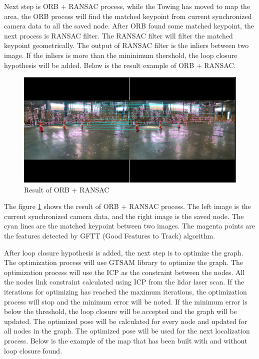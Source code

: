 \documentclass[conference]{IEEEtran}
\begin{document}
\par    
Next step is ORB + RANSAC process, while the Towing has moved to map the area, the ORB process will find the matched keypoint from current synchronized camera data to all the saved node. After ORB found some matched keypoint, the next process is RANSAC filter. The RANSAC filter will filter the matched keypoint geometrically. The output of RANSAC filter is the inliers between two image. If the inliers is more than the mininimum thershold, the loop closure hypothesis will be added. Below is the result example of ORB + RANSAC. 
\begin{figure}[H]
	\centering
	\includegraphics[width=\linewidth]{../konten/orb_ransac.png}
	\caption{Result of ORB + RANSAC}
	\label{fig:orb_ransac}
\end{figure}
The figure \ref{fig:orb_ransac} shows the result of ORB + RANSAC process. The left image is the current synchronized camera data, and the right image is the saved node. The cyan lines are the matched keypoint between two images. The magenta points are the features detected by GFTT (Good Features to Track) algorithm.
\par   
After loop closure hypothesis is added, the next step is to optimize the graph. The optimization process will use GTSAM library \cite{ref_gtsam} to optimize the graph. The optimization process will use the ICP as the constraint between the nodes. All the nodes link constraint calculated using ICP from the lidar laser scan. If the iterations for optimizing has reached the maximum iterations, the optimization process will stop and the minimum error will be noted. If the minimum error is below the threshold, the loop closure will be accepted and the graph will be updated. The optimized pose will be calculated for every node and updated for all nodes in the graph. The optimized pose will be used for the next localization process. Below is the example of the map that has been built with and without loop closure found. 
\end{document}
